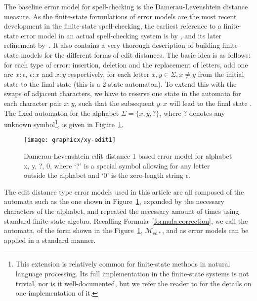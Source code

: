 \documentclass[a4paper,12pt]{article}
\begin{document}
The baseline error model for spell-checking is the Damerau-Levenshtein distance
measure. As the finite-state formulations of error models are the most recent
development in the finite-state spell-checking, the earliest reference to a
finite-state error model in an actual spell-checking system is by
\cite{schulz/2002}, and its later refinement by~\cite{mihov2004fast}.  It also
contains a very thorough description of building finite-state models for the
different forms of edit distances. The basic idea is as follows: for each type of
error: insertion, deletion and the replacement of letters, add one arc
$x:\epsilon$, $\epsilon:x$ and $x:y$ respectively, for each letter $x, y \in
\Sigma, x \neq y$ from the initial state to the final state (this is a 2 state
automaton). To extend this with the swaps of adjacent characters, we have to
reserve one state in the automata for each character pair $x:y$, such that
the subsequent $y:x$ will lead to the final state \cite[]{pirinen/2010/lrec}.
The fixed automaton for the alphabet $\Sigma = \{x, y, ?\}$, where $?$
denotes any unknown symbol\footnote{This extension is relatively common for
    finite-state methods in natural language processing. Its full
    implementation in the finite-state systems is not trivial, nor is it
    well-documented, but we refer the reader to \cite[]{beesley2003finite} for
the details on one implementation of it.}, is given in
Figure~\ref{fig:xy-edit-1}.

\begin{figure}
    \centering
    \texttt{[image: graphicx/xy-edit1]}
    \caption{Damerau-Levenshtein edit distance 1 based error model for
        alphabet {x, y, ?, 0}, where `?' is a special symbol allowing for
        any letter outside the alphabet and `0' is the zero-length string
        $\epsilon$.
    \label{fig:xy-edit-1}}
\end{figure}

The edit distance type error models used in this article are all composed of
the automata such as the one shown in Figure~\ref{fig:xy-edit-1}, expanded by
the necessary characters of the alphabet, and repeated the necessary amount of times using standard
finite-state algebra. Recalling Formula~\ref{formula:correction}, we call
the automata, of the form shown in the
Figure~\ref{fig:xy-edit-1}, $\mathcal{M}_{\mathrm{ed*}}$, and as
error models can be applied in a standard manner.
\end{document}
